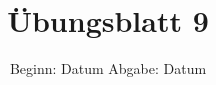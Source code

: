 

\title{Übungsblatt 9}
\date{%
  Beginn: Datum
  \hspace{3em}
  Abgabe: Datum
}



\maketitle
\thispagestyle{empty}
\tableofcontents
\newpage






